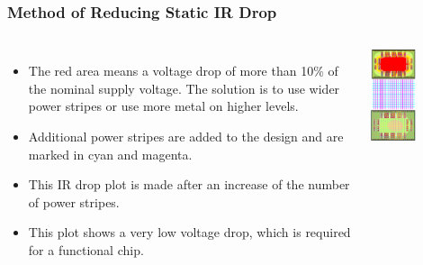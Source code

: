 \documentclass{beamer}
\begin{document}
	\begin{frame}
	\frametitle{Method of Reducing Static IR Drop}
	\begin{columns}
		\begin{itemize}
			\item The red area means a voltage drop of more than 10\% of the nominal supply voltage. The solution is to use wider power stripes or use more metal on higher levels.
			\item Additional power stripes are added to the design and are marked in cyan and magenta.
			\item This IR drop plot is made after an increase of the number of power stripes.
			\item This plot shows a very low voltage drop, which is required for a functional chip.
		\end{itemize}
		
		\begin{center}
			\includegraphics[width=0.5\textwidth]{solu2}
		\end{center}
	\end{columns}
	\end{frame}
	
\end{document}
